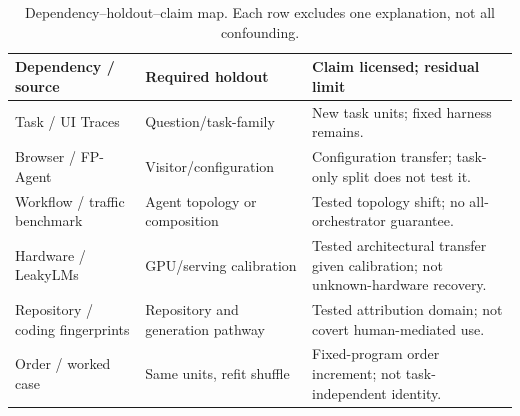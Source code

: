 \begin{table}[t]\centering\footnotesize
\caption{Dependency--holdout--claim map. Each row excludes one explanation, not all confounding.}\label{tab:dependency-holdouts}
\begin{tabularx}{\columnwidth}{@{}p{}YY@{}}\toprule
Dependency / source & Required holdout & Claim licensed; residual limit\\\midrule
Task / UI Traces & Question/task-family & New task units; fixed harness remains.\\
Browser / FP-Agent & Visitor/configuration & Configuration transfer; task-only split does not test it.\\
Workflow / traffic benchmark & Agent topology or composition & Tested topology shift; no all-orchestrator guarantee.\\
Hardware / LeakyLMs & GPU/serving calibration & Tested architectural transfer given calibration; not unknown-hardware recovery.\\
Repository / coding fingerprints & Repository and generation pathway & Tested attribution domain; not covert human-mediated use.\\
Order / worked case & Same units, refit shuffle & Fixed-program order increment; not task-independent identity.\\\bottomrule
\end{tabularx}\end{table}
